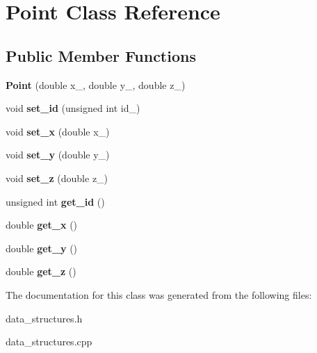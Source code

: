 \hypertarget{class_point}{}\section{Point Class Reference}
\label{class_point}
\subsection*{Public Member Functions}
\begin{DoxyCompactItemize}
\item 
\hypertarget{class_point_a610c05f7a55db8d45624461416a95600}{}{\bfseries Point} (double x\+\_\+, double y\+\_\+, double z\+\_\+)\label{class_point_a610c05f7a55db8d45624461416a95600}

\item 
\hypertarget{class_point_a4246f86e304694d8895959edf34aa51a}{}void {\bfseries set\+\_\+id} (unsigned int id\+\_\+)\label{class_point_a4246f86e304694d8895959edf34aa51a}

\item 
\hypertarget{class_point_a3fd167affdb9046f8f84b2b798bd97ff}{}void {\bfseries set\+\_\+x} (double x\+\_\+)\label{class_point_a3fd167affdb9046f8f84b2b798bd97ff}

\item 
\hypertarget{class_point_a9b6f3a4149b55639374c94d88b96e11c}{}void {\bfseries set\+\_\+y} (double y\+\_\+)\label{class_point_a9b6f3a4149b55639374c94d88b96e11c}

\item 
\hypertarget{class_point_a85fef0ff41c220b444c9e0f2f159f8f7}{}void {\bfseries set\+\_\+z} (double z\+\_\+)\label{class_point_a85fef0ff41c220b444c9e0f2f159f8f7}

\item 
\hypertarget{class_point_a03bb78a35a94208fed0020beb487c5d0}{}unsigned int {\bfseries get\+\_\+id} ()\label{class_point_a03bb78a35a94208fed0020beb487c5d0}

\item 
\hypertarget{class_point_a7467a9db2eb234926884cf88c638da93}{}double {\bfseries get\+\_\+x} ()\label{class_point_a7467a9db2eb234926884cf88c638da93}

\item 
\hypertarget{class_point_a30cce78a200b5577b03e1c9c1b1f9ad8}{}double {\bfseries get\+\_\+y} ()\label{class_point_a30cce78a200b5577b03e1c9c1b1f9ad8}

\item 
\hypertarget{class_point_a0805b76fd62782422f1b721afe65adf8}{}double {\bfseries get\+\_\+z} ()\label{class_point_a0805b76fd62782422f1b721afe65adf8}

\end{DoxyCompactItemize}


The documentation for this class was generated from the following files\+:\begin{DoxyCompactItemize}
\item 
data\+\_\+structures.\+h\item 
data\+\_\+structures.\+cpp\end{DoxyCompactItemize}
